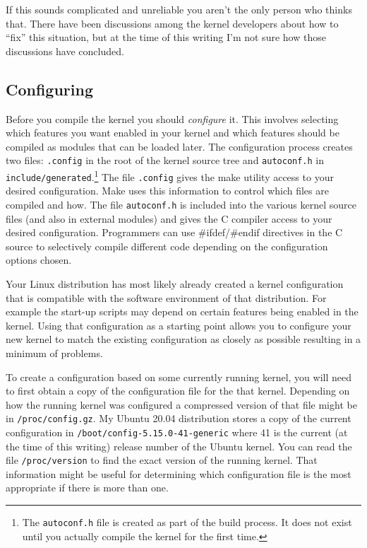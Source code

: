 \documentclass{article}
\newcommand{\filename}[1]{\texttt{#1}}
\newcommand{\newterm}[1]{\textit{#1}}
\begin{document}
If this sounds complicated and unreliable you aren't the only person who thinks that. There have
been discussions among the kernel developers about how to ``fix'' this situation, but at the
time of this writing I'm not sure how those discussions have concluded.


\subsection{Configuring}
\label{sec:configuring}

Before you compile the kernel you should \newterm{configure} it. This involves selecting which
features you want enabled in your kernel and which features should be compiled as modules that
can be loaded later. The configuration process creates two files: \filename{.config} in the root
of the kernel source tree and \filename{autoconf.h} in
\filename{include/generated}.\footnote{The \filename{autoconf.h} file is created as part of the
  build process. It does not exist until you actually compile the kernel for the first time.}
The file \filename{.config} gives the make utility access to your desired configuration. Make
uses this information to control which files are compiled and how. The file
\filename{autoconf.h} is included into the various kernel source files (and also in external
modules) and gives the C compiler access to your desired configuration. Programmers can use
\#ifdef/\#endif directives in the C source to selectively compile different code depending on
the configuration options chosen.

Your Linux distribution has most likely already created a kernel configuration that is
compatible with the software environment of that distribution. For example the start-up scripts
may depend on certain features being enabled in the kernel. Using that configuration as a
starting point allows you to configure your new kernel to match the existing configuration as
closely as possible resulting in a minimum of problems.

To create a configuration based on some currently running kernel, you will need to first obtain
a copy of the configuration file for the that kernel. Depending on how the running kernel was
configured a compressed version of that file might be in \filename{/proc/config.gz}. My Ubuntu
20.04 distribution stores a copy of the current configuration in
\filename{/boot/config-5.15.0-41-generic} where 41 is the current (at the time of this writing)
release number of the Ubuntu kernel. You can read the file \filename{/proc/version} to find the
exact version of the running kernel. That information might be useful for determining which
configuration file is the most appropriate if there is more than one.
\end{document}
